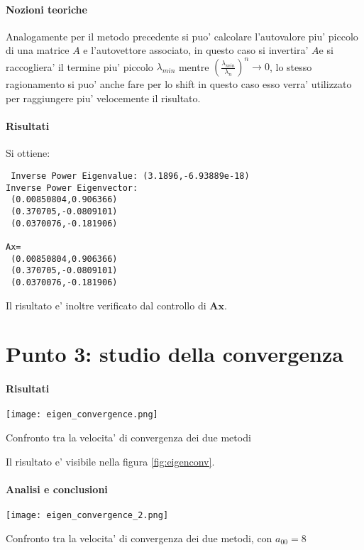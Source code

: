 \paragraph{Nozioni teoriche}

Analogamente per il metodo precedente si puo' calcolare l'autovalore piu' piccolo di una matrice $A$ e l'autovettore associato, in questo caso si invertira' $A$e si raccogliera' il termine piu' piccolo $\lambda_{min}$ mentre $\left( \frac{\lambda_{min}}{\lambda_n} \right)^n \rightarrow 0$, lo stesso ragionamento si puo' anche fare per lo shift in questo caso esso verra' utilizzato per raggiungere piu' velocemente il risultato.

\paragraph{Risultati} Si ottiene:

\begin{lstlisting}
 Inverse Power Eigenvalue: (3.1896,-6.93889e-18)
Inverse Power Eigenvector: 
 (0.00850804,0.906366)
 (0.370705,-0.0809101)
 (0.0370076,-0.181906)

Ax= 
 (0.00850804,0.906366)
 (0.370705,-0.0809101)
 (0.0370076,-0.181906)
\end{lstlisting}

Il risultato e' inoltre verificato dal controllo di $\mathbf{Ax}$.

\section{Punto 3: studio della convergenza}

\paragraph{Risultati}


\begin{marginfigure}
	\texttt{[image: eigen\_convergence.png]}
	\caption{Confronto tra la velocita' di convergenza dei due metodi}
	\label{fig:eigenconv}
\end{marginfigure}

Il risultato e' visibile nella figura \ref{fig:eigenconv}.

\paragraph{Analisi e conclusioni}

\begin{marginfigure}
	\texttt{[image: eigen\_convergence\_2.png]}
	\caption{Confronto tra la velocita' di convergenza dei due metodi, con $a_{00} = 8$}
	\label{fig:eigenconv_2}
\end{marginfigure}


